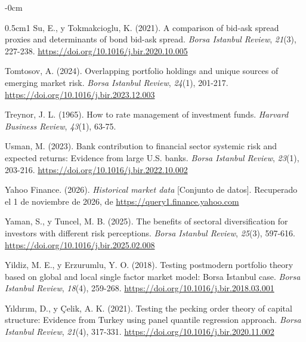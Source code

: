\documentclass[jrfm,article,submit,oneauthor]{Definitions/mdpi}
\begin{document}
\begin{adjustwidth}{-\extralength}{0cm}
{\begin{hangparas}{0.5cm}{1}
Su, E., y Tokmakcioglu, K. (2021). A comparison of bid-ask spread proxies and determinants of bond bid-ask spread. \textit{Borsa Istanbul Review}, \textit{21}(3), 227-238. \url{https://doi.org/10.1016/j.bir.2020.10.005}

Tomtosov, A. (2024). Overlapping portfolio holdings and unique sources of emerging market risk. \textit{Borsa Istanbul Review}, \textit{24}(1), 201-217. \url{https://doi.org/10.1016/j.bir.2023.12.003}

Treynor, J. L. (1965). How to rate management of investment funds. \textit{Harvard Business Review}, \textit{43}(1), 63-75.

Usman, M. (2023). Bank contribution to financial sector systemic risk and expected returns: Evidence from large U.S. banks. \textit{Borsa Istanbul Review}, \textit{23}(1), 203-216. \url{https://doi.org/10.1016/j.bir.2022.10.002}

Yahoo Finance. (2026). \textit{Historical market data} [Conjunto de datos]. Recuperado el 1 de noviembre de 2026, de \url{https://query1.finance.yahoo.com}

Yaman, S., y Tuncel, M. B. (2025). The benefits of sectoral diversification for investors with different risk perceptions. \textit{Borsa Istanbul Review}, \textit{25}(3), 597-616. \url{https://doi.org/10.1016/j.bir.2025.02.008}

Yildiz, M. E., y Erzurumlu, Y. O. (2018). Testing postmodern portfolio theory based on global and local single factor market model: Borsa Istanbul case. \textit{Borsa Istanbul Review}, \textit{18}(4), 259-268. \url{https://doi.org/10.1016/j.bir.2018.03.001}

Yıldırım, D., y Çelik, A. K. (2021). Testing the pecking order theory of capital structure: Evidence from Turkey using panel quantile regression approach. \textit{Borsa Istanbul Review}, \textit{21}(4), 317-331. \url{https://doi.org/10.1016/j.bir.2020.11.002}
\end{hangparas}
}
\end{adjustwidth}
\end{document}
